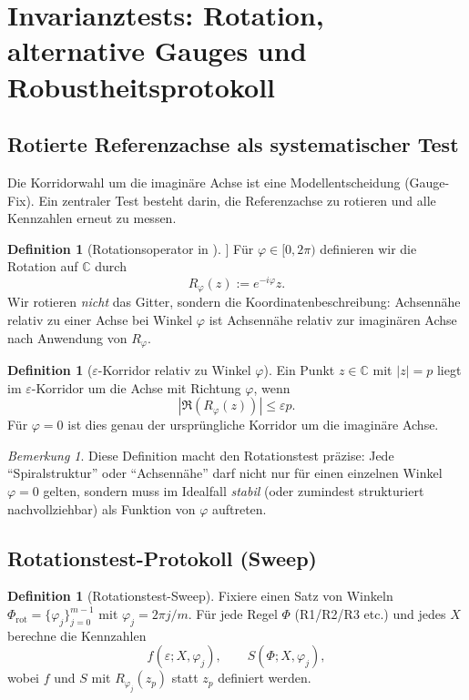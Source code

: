 \documentclass[a4paper,11pt]{article}
\theoremstyle{definition}
\newtheorem{definition}[satz]{Definition}
\theoremstyle{remark}
\newtheorem{bemerkung}[satz]{Bemerkung}
\newcommand{\C}{\mathbb{C}}
\newcommand{\Zi}{\mathbb{Z}[i]}
\begin{document}
	
	\section{Invarianztests: Rotation, alternative Gauges und Robustheitsprotokoll}
	\label{sec:invarianz}
	
	\subsection{Rotierte Referenzachse als systematischer Test}
	Die Korridorwahl um die imaginäre Achse ist eine Modellentscheidung (Gauge-Fix). Ein zentraler Test besteht darin,
	die Referenzachse zu rotieren und alle Kennzahlen erneut zu messen.
	
	\begin{definition}[Rotationsoperator in \(\Zi\)]
		Für \(\varphi\in[0,2\pi)\) definieren wir die Rotation auf \(\C\) durch
		\[
		R_\varphi(z):=e^{-i\varphi}z.
		\]
		Wir rotieren \emph{nicht} das Gitter, sondern die Koordinatenbeschreibung: Achsennähe relativ zu einer Achse bei Winkel \(\varphi\)
		ist Achsennähe relativ zur imaginären Achse nach Anwendung von \(R_\varphi\).
	\end{definition}
	
	\begin{definition}[\(\varepsilon\)-Korridor relativ zu Winkel \(\varphi\)]
		Ein Punkt \(z\in\C\) mit \(|z|=p\) liegt im \(\varepsilon\)-Korridor um die Achse mit Richtung \(\varphi\), wenn
		\[
		\left|\Re\left(R_\varphi(z)\right)\right|\le \varepsilon p.
		\]
		Für \(\varphi=0\) ist dies genau der ursprüngliche Korridor um die imaginäre Achse.
	\end{definition}
	
	\begin{bemerkung}
		Diese Definition macht den Rotationstest präzise: Jede ``Spiralstruktur'' oder ``Achsennähe'' darf nicht nur
		für einen einzelnen Winkel \(\varphi=0\) gelten, sondern muss im Idealfall \emph{stabil} (oder zumindest strukturiert nachvollziehbar)
		als Funktion von \(\varphi\) auftreten.
	\end{bemerkung}
	
	\subsection{Rotationstest-Protokoll (Sweep)}
	\begin{definition}[Rotationstest-Sweep]
		Fixiere einen Satz von Winkeln \(\Phi_\mathrm{rot}=\{\varphi_j\}_{j=0}^{m-1}\) mit \(\varphi_j=2\pi j/m\).
		Für jede Regel \(\Phi\) (R1/R2/R3 etc.) und jedes \(X\) berechne die Kennzahlen
		\[
		f(\varepsilon;X,\varphi_j),\qquad S(\Phi;X,\varphi_j),
		\]
		wobei \(f\) und \(S\) mit \(R_{\varphi_j}(z_p)\) statt \(z_p\) definiert werden.
	\end{definition}
	
\end{document}
